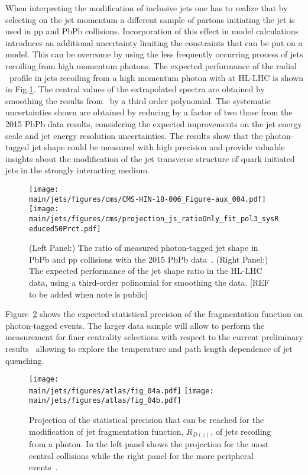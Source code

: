 When interpreting the modification of inclusive jets one has to realize that by selecting on the jet momentum a different sample of partons initiating the jet is used in pp and PbPb collisions. Incorporation of this effect in model calculations introduces an additional uncertainty limiting the constraints that can be put on a model. This can be overcome by using the less frequently occurring process of jets recoiling from high momentum photons. The expected performance of the radial \pT\ profile in jets recoiling from a high momentum photon with at HL-LHC is shown in Fig.\ref{fig:jetshape}. The central values of the extrapolated spectra are obtained by smoothing the results from~\cite{Sirunyan:2018ncy} by a third order polynomial. The systematic uncertainties shown are obtained by reducing by a factor of two those from the 2015 PbPb data results, considering the expected improvements on the jet energy scale and jet energy resolution uncertainties. The results show that the photon-tagged jet shape could be measured with high precision and provide valuable insights about the modification of the jet transverse structure of quark initiated jets in the strongly interacting medium.
%
\begin{figure}[!ht]
\begin{center}
\texttt{[image: \\main/jets/figures/cms/CMS-HIN-18-006\_Figure-aux\_004.pdf]}
\texttt{[image: \\main/jets/figures/cms/projection\_js\_ratioOnly\_fit\_pol3\_sysReduced50Prct.pdf]}
\caption{(Left Panel:) The ratio of measured photon-tagged jet shape in PbPb and pp collisions with the 2015 PbPb data~\cite{Sirunyan:2018ncy}. (Right Panel:) The expected performance of the jet shape ratio in the HL-LHC data, using a third-order polinomial for smoothing the data. [REF to be added when note is public]}
\label{fig:jetshape}
\end{center}
\end{figure}
%
Figure~\ref{fig:jetDzPh} shows the expected statistical precision of the fragmentation function on photon-tagged events. The larger data sample will allow to perform the measurement for finer centrality selections with respect to the current preliminary results~\cite{ATLAS-CONF-2017-074} allowing to explore the temperature and path length dependence of jet quenching. 
\begin{figure}[!ht]
\begin{center}
\texttt{[image: \\main/jets/figures/atlas/fig\_04a.pdf]}
\texttt{[image: \\main/jets/figures/atlas/fig\_04b.pdf]}
\caption{Projection of the statistical precision that can be reached for the modification of jet fragmentation function, $R_{D(z)}$, of jets recoiling from a photon. In the left panel shows the projection for the most central collisions while the right panel for the more peripheral events~\cite{ATL-PHYS-PUB-2018-019}.}
\label{fig:jetDzPh}
\end{center}
\end{figure}

